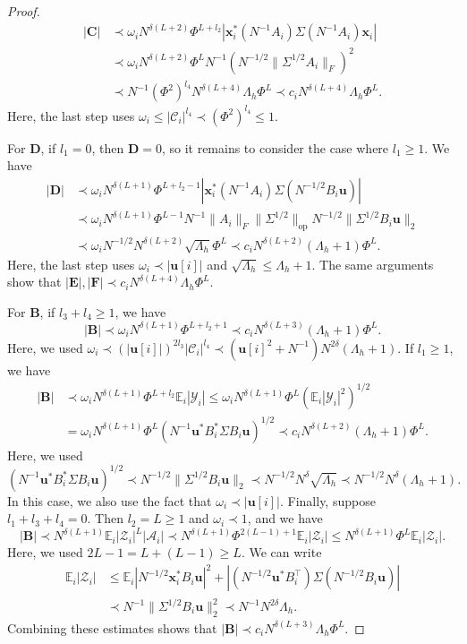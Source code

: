 \documentclass[11pt,reqno]{amsart}
\def\u{\mathbf{u}}
\def\x{\mathbf{x}}
\def\E{\mathbb{E}}
\def\cA{\mathcal{A}}
\def\cY{\mathcal{Y}}
\def\cZ{\mathcal{Z}}
\def\cC{\mathcal{C}}
\def\op{\mathrm{op}}
\theoremstyle{definition}
\numberwithin{equation}{section}
\numberwithin{figure}{section}
\begin{document}
\begin{proof}
\begin{align*}
    |\mathbf{C}|&\prec\omega_iN^{\delta(L+2)}\Phi^{L+l_2}|\x_i^*(N^{-1}A_i)\Sigma(N^{-1}A_i)\x_i|\\
    &\prec \omega_iN^{\delta(L+2)}\Phi^{L}N^{-1}(N^{-1/2}\|\Sigma^{1/2}A_i\|_F)^2\\
    &\prec N^{-1}(\Phi^2)^{l_4}N^{\delta(L+4)}\Lambda_h\Phi^L\prec c_iN^{\delta(L+4)}\Lambda_h\Phi^L.
\end{align*}
Here, the last step uses $\omega_i\leq |\cC_i|^{l_4}\prec (\Phi^2)^{l_4}\leq 1$.

For $\mathbf{D}$, if $l_1=0$, then $\mathbf{D}=0$, so it remains to consider the case where $l_1\geq 1$. We have
\begin{align*}
    |\mathbf{D}|&\prec\omega_iN^{\delta(L+1)}\Phi^{L+l_2-1}|\x_i^*(N^{-1}A_i)\Sigma(N^{-1/2}B_i\u)|\\
    &\prec\omega_iN^{\delta(L+1)}\Phi^{L-1}N^{-1}\|A_i\|_F\|\Sigma^{1/2}\|_\op N^{-1/2}\|\Sigma^{1/2}B_i\u\|_2\\
    &\prec\omega_iN^{-1/2}N^{\delta(L+2)}\sqrt{\Lambda_h}\Phi^{L}\prec c_iN^{\delta(L+2)}(\Lambda_h+1)\Phi^{L}.
\end{align*}
Here, the last step uses $\omega_i\prec|\u[i]|$ and $\sqrt{\Lambda_h}\leq\Lambda_h+1$. The same arguments show that $|\mathbf{E}|,|\mathbf{F}|\prec c_iN^{\delta(L+4)}\Lambda_h\Phi^L$.

For $\mathbf{B}$, if $l_3+l_4\geq 1$, we have
\[
    |\mathbf{B}|\prec\omega_iN^{\delta(L+1)}\Phi^{L+l_2+1}\prec c_iN^{\delta(L+3)}(\Lambda_h+1)\Phi^L.
\]
Here, we used $\omega_i\prec(|\u[i]|)^{2l_3}|\cC_i|^{l_4}\prec(\u[i]^2+N^{-1})N^{2\delta}(\Lambda_h+1)$. If $l_1\geq 1$, we have
\begin{align*}
    |\mathbf{B}|&\prec\omega_iN^{\delta(L+1)}\Phi^{L+l_2}\E_i|\cY_i|\leq \omega_iN^{\delta(L+1)}\Phi^{L}(\E_i|\cY_i|^2)^{1/2}\\
    &=\omega_iN^{\delta(L+1)}\Phi^{L}(N^{-1}\u^*B_i^*\Sigma B_i\u)^{1/2}\prec c_iN^{\delta(L+2)}(\Lambda_h+1)\Phi^L.
\end{align*}
Here, we used
\[
    (N^{-1}\u^*B_i^*\Sigma B_i\u)^{1/2}\prec N^{-1/2}\|\Sigma^{1/2}B_i\u\|_2\prec N^{-1/2}N^\delta\sqrt{\Lambda_h}\prec N^{-1/2}N^\delta(\Lambda_h+1).
\]
In this case, we also use the fact that $\omega_i\prec|\u[i]|$. Finally, suppose $l_1+l_3+l_4=0$. Then $l_2=L\geq 1$ and $\omega_i\prec 1$, and we have
\[
    |\mathbf{B}|\prec N^{\delta(L+1)}\E_i|\cZ_i|^L|\cA_i|\prec N^{\delta(L+1)}\Phi^{2(L-1)+1}\E_i|\cZ_i|\leq N^{\delta(L+1)}\Phi^L\E_i|\cZ_i|.
\]
Here, we used $2L-1=L+(L-1)\geq L$. We can write
\begin{align*}
    \E_i|\cZ_i|&\leq\E_i|N^{-1/2}\x_i^*B_i\u|^2+|(N^{-1/2}\u^*B_i^\top)\Sigma(N^{-1/2}B_i\u)|\\
    &\prec N^{-1}\|\Sigma^{1/2}B_i\u\|_2^2\prec N^{-1}N^{2\delta}\Lambda_h.
\end{align*}
Combining these estimates shows that $|\mathbf{B}|\prec c_iN^{\delta(L+3)}\Lambda_h\Phi^L$.


\end{proof}
\end{document}
